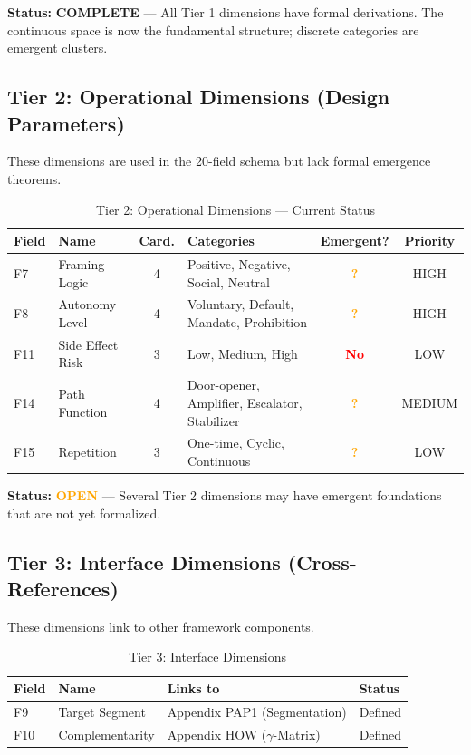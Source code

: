 \textbf{Status:} \textcolor{green!60!black}{\textbf{COMPLETE}} --- All Tier 1 dimensions have formal derivations. The continuous space is now the fundamental structure; discrete categories are emergent clusters.

\subsection{Tier 2: Operational Dimensions (Design Parameters)}

These dimensions are used in the 20-field schema but lack formal emergence theorems.

\begin{table}[htbp]
\centering
\caption{Tier 2: Operational Dimensions --- Current Status}
\label{tab:hhh-tier2}
\renewcommand{\arraystretch}{1.3}
\small
\begin{tabular}{@{}llclcc@{}}
\toprule
\textbf{Field} & \textbf{Name} & \textbf{Card.} & \textbf{Categories} & \textbf{Emergent?} & \textbf{Priority} \\
\midrule
F7 & Framing Logic & 4 & Positive, Negative, Social, Neutral & \textcolor{orange}{\textbf{?}} & HIGH \\
F8 & Autonomy Level & 4 & Voluntary, Default, Mandate, Prohibition & \textcolor{orange}{\textbf{?}} & HIGH \\
F11 & Side Effect Risk & 3 & Low, Medium, High & \textcolor{red}{\textbf{No}} & LOW \\
F14 & Path Function & 4 & Door-opener, Amplifier, Escalator, Stabilizer & \textcolor{orange}{\textbf{?}} & MEDIUM \\
F15 & Repetition & 3 & One-time, Cyclic, Continuous & \textcolor{orange}{\textbf{?}} & LOW \\
\bottomrule
\end{tabular}
\end{table}

\textbf{Status:} \textcolor{orange}{\textbf{OPEN}} --- Several Tier 2 dimensions may have emergent foundations that are not yet formalized.

\subsection{Tier 3: Interface Dimensions (Cross-References)}

These dimensions link to other framework components.

\begin{table}[htbp]
\centering
\caption{Tier 3: Interface Dimensions}
\label{tab:hhh-tier3}
\renewcommand{\arraystretch}{1.3}
\begin{tabular}{@{}llll@{}}
\toprule
\textbf{Field} & \textbf{Name} & \textbf{Links to} & \textbf{Status} \\
\midrule
F9 & Target Segment & Appendix PAP1 (Segmentation) & \textcolor{green!60!black}{Defined} \\
F10 & Complementarity & Appendix HOW ($\gamma$-Matrix) & \textcolor{green!60!black}{Defined} \\
\bottomrule
\end{tabular}
\end{table}

